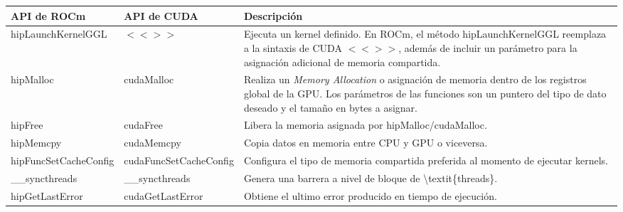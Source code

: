 \begin{table}[h!]
\footnotesize
\begin{tabularx}{\textwidth}{|p{}|p{}|X|}
\hline
API de ROCm           & API de CUDA            & Descripción                                                                                                                                                                                                                   \\ \hline
hipLaunchKernelGGL    & $<<>>$                 & Ejecuta un kernel definido. En ROCm, el método hipLaunchKernelGGL reemplaza a la sintaxis de CUDA $<<>>$, además de incluir un parámetro para la asignación adicional de memoria compartida.                                  \\ \hline
hipMalloc             & cudaMalloc             & Realiza un \textit{Memory Allocation} o asignación de memoria dentro de los registros global de la GPU. Los parámetros de las funciones son un puntero del tipo de dato deseado y el tamaño en bytes a asignar. \\ \hline
hipFree               & cudaFree               & Libera la memoria asignada por hipMalloc/cudaMalloc.                                                                                                                                                                          \\ \hline
hipMemcpy             & cudaMemcpy             & Copia datos en memoria entre CPU y GPU o viceversa.                                                                                                                                                                           \\ \hline
hipFuncSetCacheConfig & cudaFuncSetCacheConfig & Configura el tipo de memoria compartida preferida al momento de ejecutar kernels.                                                                                                                                             \\ \hline
\_\_syncthreads       & \_\_syncthreads        & Genera una barrera a nivel de bloque de \textbackslash{}textit\{threads\}.                                                                                                                                                    \\ \hline
hipGetLastError       & cudaGetLastError       & Obtiene el ultimo error producido en tiempo de ejecución.                                                                                                                                                                     \\ \hline

\end{tabularx}
\end{table}
